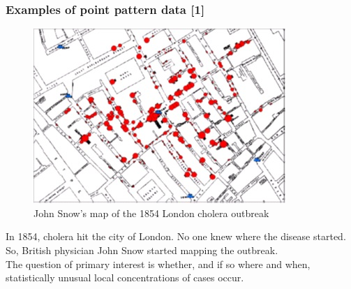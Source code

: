 \documentclass[12pt]{beamer}
\begin{document}
\begin{frame}
\frametitle{Examples of point pattern data [1]}
\begin{figure}
\includegraphics[scale=1]{Figures/colera.jpg}
\caption{\footnotesize John Snow's map of the 1854 London cholera outbreak}
\end{figure}
\footnotesize{In 1854, cholera hit the city of London. No one knew where the disease started. So, British physician John Snow started mapping the outbreak. \\
The question of primary interest is whether, and if so where and when, statistically unusual local concentrations of cases occur.}


\end{frame}
\end{document}
